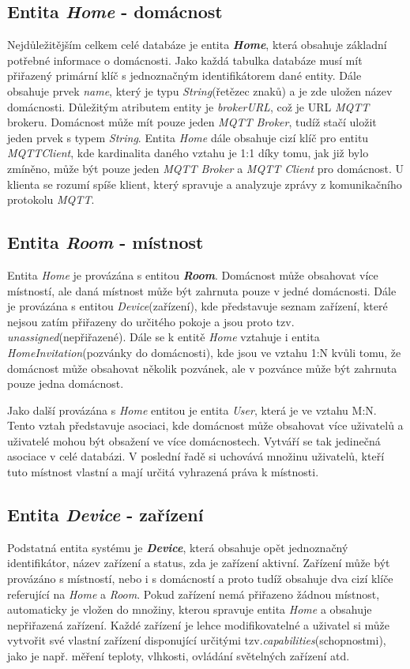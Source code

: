 \subsection*{Entita \emph{Home} - domácnost}
\label{databaze:home}
Nejdůležitějším celkem celé databáze je entita \textbf{\emph{Home}}, která obsahuje základní potřebné informace o domácnosti.
Jako každá tabulka databáze musí mít přiřazený primární klíč s jednoznačným identifikátorem dané entity.
Dále obsahuje prvek \emph{name}, který je typu \emph{String}(řetězec znaků) a je zde uložen název domácnosti.
Důležitým atributem entity je \emph{brokerURL}, což je URL \emph{MQTT} brokeru.
Domácnost může mít pouze jeden \emph{MQTT Broker}, tudíž stačí uložit jeden prvek s typem \emph{String}.
Entita \emph{Home} dále obsahuje cizí klíč pro entitu \emph{MQTTClient}, kde kardinalita daného vztahu je 1:1 díky tomu, jak již bylo zmíněno, může být pouze jeden \emph{MQTT Broker} a \emph{MQTT Client} pro domácnost.
U klienta se rozumí spíše klient, který spravuje a analyzuje zprávy z komunikačního protokolu \emph{MQTT}.

\subsection*{Entita \emph{Room} - místnost}
\label{databaze:room}
Entita \emph{Home} je provázána s entitou \textbf{\emph{Room}}.
Domácnost může obsahovat více místností, ale daná místnost může být zahrnuta pouze v jedné domácnosti.
Dále je provázána s entitou \emph{Device}(zařízení), kde představuje seznam zařízení, které nejsou zatím přiřazeny do určitého pokoje a jsou proto tzv. \emph{unassigned}(nepřiřazené).
Dále se k entitě \emph{Home} vztahuje i entita \emph{HomeInvitation}(pozvánky do domácnosti), kde jsou ve vztahu 1:N kvůli tomu, že domácnost může obsahovat několik pozvánek, ale v pozvánce může být zahrnuta pouze jedna domácnost.

Jako další provázána s \emph{Home} entitou je entita \emph{User}, která je ve vztahu M:N.
Tento vztah představuje asociaci, kde domácnost může obsahovat více uživatelů a uživatelé mohou být obsažení ve více domácnostech.
Vytváří se tak jedinečná asociace v celé databázi.
V poslední řadě si uchovává množinu uživatelů, kteří tuto místnost vlastní a mají určitá vyhrazená práva k místnosti.

\subsection*{Entita \emph{Device} - zařízení}
\label{databaze:device}
Podstatná entita systému je \textbf{\emph{Device}}, která obsahuje opět jednoznačný identifikátor, název zařízení a status, zda je zařízení aktivní.
Zařízení může být provázáno s místností, nebo i s domácností a proto tudíž obsahuje dva cizí klíče referující na \emph{Home} a \emph{Room}.
Pokud zařízení nemá přiřazeno žádnou místnost, automaticky je vložen do množiny, kterou spravuje entita \emph{Home} a obsahuje nepřiřazená zařízení.
Každé zařízení je lehce modifikovatelné a uživatel si může vytvořit své vlastní zařízení disponující určitými tzv.\emph{capabilities}(schopnostmi), jako je např. měření teploty, vlhkosti, ovládání světelných zařízení atd.

